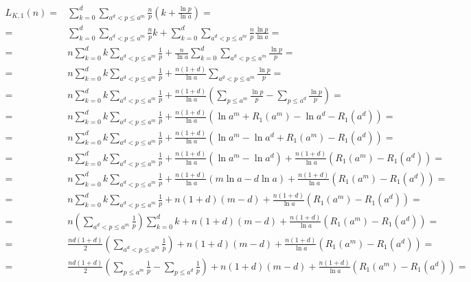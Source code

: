 \documentclass{article}
\begin{document}
\begin{align*}
L_{K,1}(n) =& \sum_{k=0}^{d} \sum_{a^d < p \le a^m} \frac{n}{p} \left( k + \frac{\ln{p}}{\ln{a}} \right) = \\
=& \sum_{k=0}^{d} \sum_{a^d < p \le a^m} \frac{n}{p} k + \sum_{k=0}^{d} \sum_{a^d < p \le a^m} \frac{n}{p} \frac{\ln{p}}{\ln{a}} = \\
=& n \sum_{k=0}^{d} k \sum_{a^d < p \le a^m} \frac{1}{p} + \frac{n}{\ln{a}} \sum_{k=0}^{d} \sum_{a^d < p \le a^m} \frac{\ln{p}}{p} = \\
=& n \sum_{k=0}^{d} k \sum_{a^d < p \le a^m} \frac{1}{p} + \frac{n \left( 1 + d \right)}{\ln{a}} \sum_{a^d < p \le a^m} \frac{\ln{p}}{p} = \\
=& n \sum_{k=0}^{d} k \sum_{a^d < p \le a^m} \frac{1}{p} + \frac{n \left( 1 + d \right)}{\ln{a}} \left( \sum_{p \le a^m} \frac{\ln{p}}{p} - \sum_{p \le a^d} \frac{\ln{p}}{p} \right) = \\
=& n \sum_{k=0}^{d} k \sum_{a^d < p \le a^m} \frac{1}{p} + \frac{n \left( 1 + d \right)}{\ln{a}} \left( \ln{a^m} + R_1(a^m) - \ln{a^d} - R_1(a^d) \right) = \\
=& n \sum_{k=0}^{d} k \sum_{a^d < p \le a^m} \frac{1}{p} + \frac{n \left( 1 + d \right)}{\ln{a}} \left( \ln{a^m} - \ln{a^d} + R_1(a^m) - R_1(a^d) \right) = \\
=& n \sum_{k=0}^{d} k \sum_{a^d < p \le a^m} \frac{1}{p} + \frac{n \left( 1 + d \right)}{\ln{a}} \left( \ln{a^m} - \ln{a^d} \right) + \frac{n \left( 1 + d \right)}{\ln{a}} \left( R_1(a^m) - R_1(a^d) \right) = \\
=& n \sum_{k=0}^{d} k \sum_{a^d < p \le a^m} \frac{1}{p} + \frac{n \left( 1 + d \right)}{\ln{a}} \left( m \ln{a} - d \ln{a} \right) + \frac{n \left( 1 + d \right)}{\ln{a}} \left( R_1(a^m) - R_1(a^d) \right) = \\
=& n \sum_{k=0}^{d} k \sum_{a^d < p \le a^m} \frac{1}{p} + n \left( 1 + d \right) \left( m - d \right) + \frac{n \left( 1 + d \right)}{\ln{a}} \left( R_1(a^m) - R_1(a^d) \right) = \\
=& n \left( \sum_{a^d < p \le a^m} \frac{1}{p} \right) \sum_{k=0}^{d} k + n \left( 1 + d \right) \left( m - d \right) + \frac{n \left( 1 + d \right)}{\ln{a}} \left( R_1(a^m) - R_1(a^d) \right) = \\
=& \frac{n d ( 1 + d )}{2} \left( \sum_{a^d < p \le a^m} \frac{1}{p} \right) + n \left( 1 + d \right) \left( m - d \right) + \frac{n \left( 1 + d \right)}{\ln{a}} \left( R_1(a^m) - R_1(a^d) \right) = \\
=& \frac{n d ( 1 + d )}{2} \left( \sum_{p \le a^m} \frac{1}{p} - \sum_{p \le a^d} \frac{1}{p} \right) + n \left( 1 + d \right) \left( m - d \right) + \frac{n \left( 1 + d \right)}{\ln{a}} \left( R_1(a^m) - R_1(a^d) \right) = \\
\end{align*}
\end{document}
